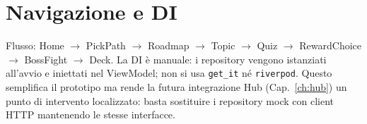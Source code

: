 \section{Navigazione e DI}
Flusso: Home $\rightarrow$ PickPath $\rightarrow$ Roadmap $\rightarrow$
Topic $\rightarrow$ Quiz $\rightarrow$ RewardChoice $\rightarrow$ BossFight
$\rightarrow$ Deck. La DI è manuale: i repository vengono istanziati
all'avvio e iniettati nel ViewModel; non si usa \texttt{get\_it} né
\texttt{riverpod}. Questo semplifica il prototipo ma rende la futura
integrazione Hub (Cap.~\ref{ch:hub}) un punto di intervento localizzato:
basta sostituire i repository mock con client HTTP mantenendo le stesse
interfacce.
